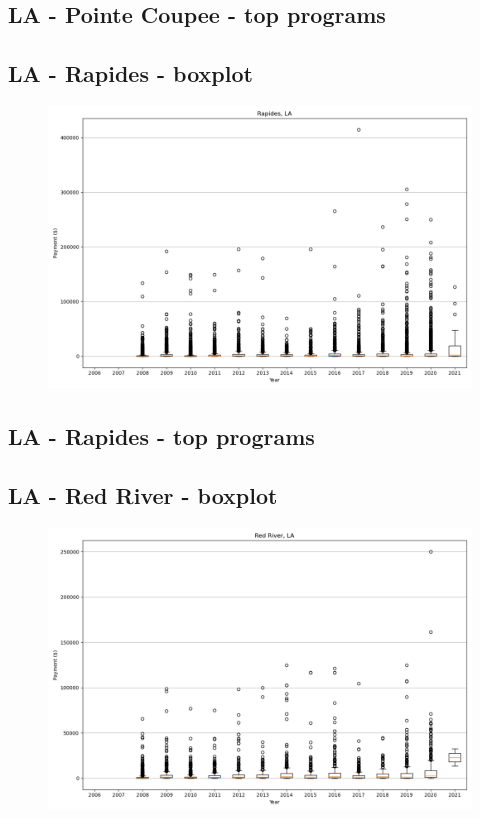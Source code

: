 \subsection*{LA - Pointe Coupee - top programs}

\newpage
\subsection*{LA - Rapides - boxplot}
\begin{figure}[h]
\centering
\includegraphics[width=7in]{../output/boxplots/counties/Rapides-LA_boxplot.png}
\end{figure}


\subsection*{LA - Rapides - top programs}

\newpage
\subsection*{LA - Red River - boxplot}
\begin{figure}[h]
\centering
\includegraphics[width=7in]{../output/boxplots/counties/Red River-LA_boxplot.png}
\end{figure}


